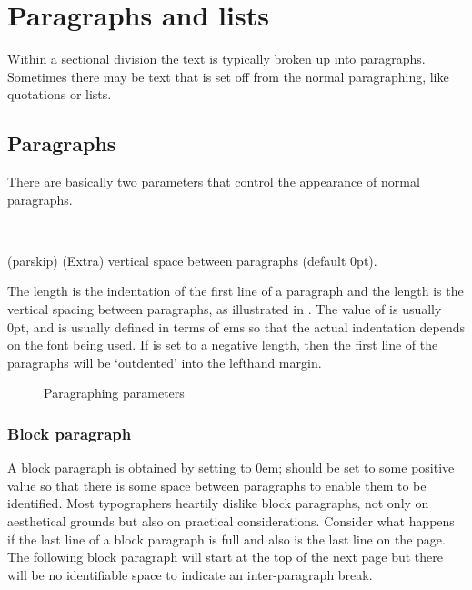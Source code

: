 \chapter{Paragraphs and lists}


    Within a sectional division the text is typically broken up into
paragraphs. Sometimes there may be text that is set off from the normal
paragraphing, like quotations or lists.

\section{Paragraphs}


    There are basically two parameters that control the appearance of normal
paragraphs.

\begin{syntax}
\lnc{\parindent} \lnc{\parskip} \\
\end{syntax}
\glossary(parskip)%
  {}%
  {(Extra) vertical space between paragraphs (default 0pt).}
 
    The length \lnc{\parindent} is the indentation of the first line of a
paragraph and the length \lnc{\parskip} is the vertical spacing between
paragraphs, as illustrated in . The value of \lnc{\parskip}
is usually 0pt, and \lnc{\parindent} is usually defined in terms of ems so
that the actual indentation depends on the font being used. If \lnc{\parindent}
is set to a negative length, then the first line of the paragraphs will be 
`outdented' into the lefthand 
margin.

\begin{figure}
\centering
\drawparameterstrue
\drawparagraph
\caption{Paragraphing parameters}\label{fig:para}
\end{figure}

\subsection{Block paragraph}

    A block paragraph is obtained by setting 
\lnc{\parindent} to 0em; 
\lnc{\parskip} should be set to some positive value so that there is some
space between paragraphs to enable them to be identified. Most typographers
heartily dislike block paragraphs, not only on aesthetical grounds but also
on practical considerations. 
Consider what happens if the last line of a block 
paragraph is full and also is the last line on the page. The following
block paragraph will start at the top of the next page but there will be
no identifiable space to indicate an inter-paragraph break.

